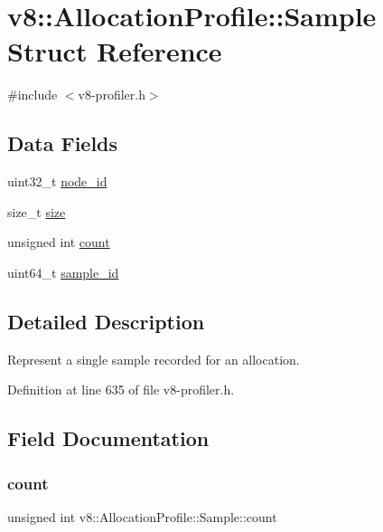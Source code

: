 \hypertarget{structv8_1_1AllocationProfile_1_1Sample}{}\section{v8\+:\+:Allocation\+Profile\+:\+:Sample Struct Reference}
\label{structv8_1_1AllocationProfile_1_1Sample}


{\ttfamily \#include $<$v8-\/profiler.\+h$>$}

\subsection*{Data Fields}
\begin{DoxyCompactItemize}
\item 
uint32\+\_\+t \mbox{\hyperlink{structv8_1_1AllocationProfile_1_1Sample_ab84cfd942c2b6d42f25874b5008cfc35}{node\+\_\+id}}
\item 
size\+\_\+t \mbox{\hyperlink{structv8_1_1AllocationProfile_1_1Sample_aa8775ce782c6fcc5a20922f604190dd5}{size}}
\item 
unsigned int \mbox{\hyperlink{structv8_1_1AllocationProfile_1_1Sample_a0c121684db4adc4e4757b85d919bb0e7}{count}}
\item 
uint64\+\_\+t \mbox{\hyperlink{structv8_1_1AllocationProfile_1_1Sample_afc21641115d4a9684363ac873750422c}{sample\+\_\+id}}
\end{DoxyCompactItemize}


\subsection{Detailed Description}
Represent a single sample recorded for an allocation. 

Definition at line 635 of file v8-\/profiler.\+h.



\subsection{Field Documentation}
\mbox{\label{structv8_1_1AllocationProfile_1_1Sample_a0c121684db4adc4e4757b85d919bb0e7}} 
\subsubsection{\texorpdfstring{count}{count}}
{\footnotesize\ttfamily unsigned int v8\+::\+Allocation\+Profile\+::\+Sample\+::count}

